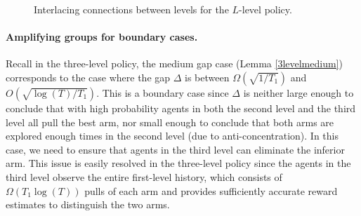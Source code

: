 \begin{figure}[h]
\centering
{}
\caption{Interlacing connections between levels for the $L$-level policy.}
\label{fig:llevel-connecting}
\end{figure}

\paragraph{Amplifying groups for boundary cases.} Recall in the
three-level policy, the medium gap case (Lemma \ref{3levelmedium})
corresponds to the case where the gap $\Delta$ is between
$\Omega\left(\sqrt{{1}/{T_1}}\right)$ and
$O\left(\sqrt{{\log(T)}/{T_1}}\right)$. This is a boundary case since
$\Delta$ is neither large enough to conclude that with high
probability agents in both the second level and the third level all
pull the best arm, nor small enough to conclude that both arms are
explored enough times in the second level (due to
anti-concentration). In this case, we need to ensure that agents in
the third level can eliminate the inferior arm. This issue is easily
resolved in the three-level policy since the agents in the third level
observe the entire first-level history, which consists of
$\Omega(T_1\log(T))$ pulls of each arm and provides sufficiently
accurate reward estimates to distinguish the two arms.

